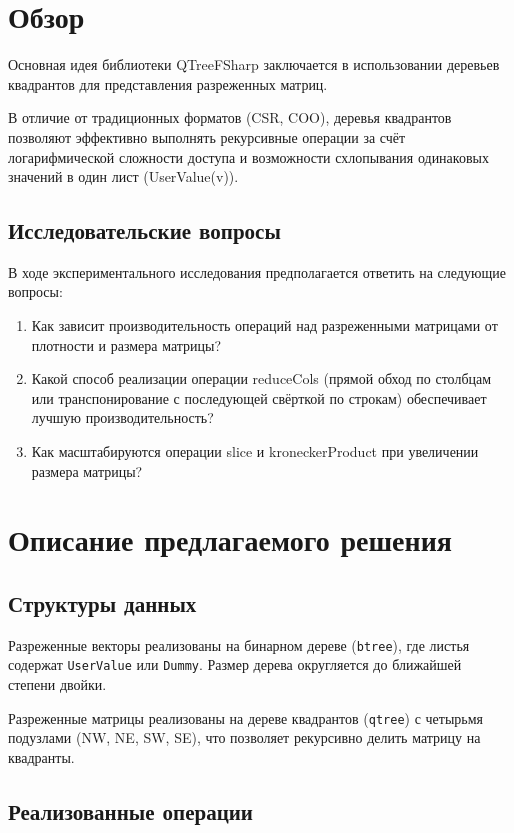 \documentclass[a4paper]{article}
\begin{document}
\section{Обзор}

Основная идея библиотеки QTreeFSharp заключается в использовании деревьев квадрантов для представления разреженных матриц.

В отличие от традиционных форматов (CSR, COO), деревья квадрантов позволяют эффективно выполнять рекурсивные операции за счёт логарифмической сложности доступа и возможности схлопывания одинаковых значений в один лист (UserValue(v)).

\subsection{Исследовательские вопросы}

В ходе экспериментального исследования предполагается ответить на следующие вопросы:

\begin{enumerate}
    \item Как зависит производительность операций над разреженными матрицами от плотности и размера матрицы?
    \item Какой способ реализации операции reduceCols (прямой обход по столбцам или транспонирование с последующей свёрткой по строкам) обеспечивает лучшую производительность?
    \item Как масштабируются операции slice и kroneckerProduct при увеличении размера матрицы?
\end{enumerate}

\section{Описание предлагаемого решения}

\subsection{Структуры данных}

Разреженные векторы реализованы на бинарном дереве (\texttt{btree}), где листья содержат \texttt{UserValue} или \texttt{Dummy}. Размер дерева округляется до ближайшей степени двойки.

Разреженные матрицы реализованы на дереве квадрантов (\texttt{qtree}) с четырьмя подузлами (NW, NE, SW, SE), что позволяет рекурсивно делить матрицу на квадранты.

\subsection{Реализованные операции}
\end{document}
